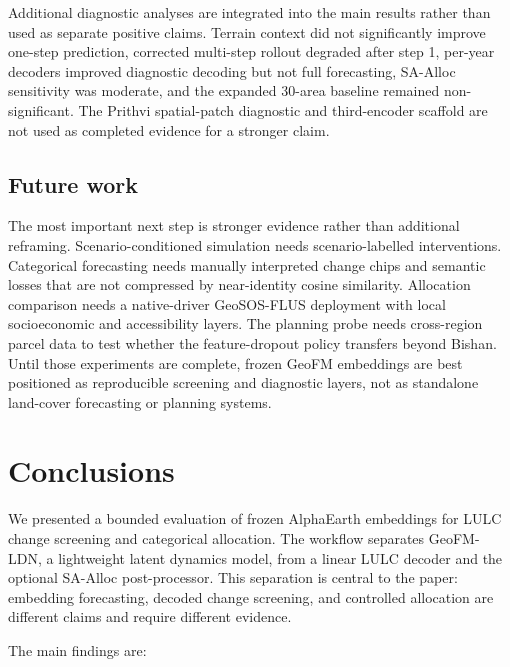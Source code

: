 \documentclass{article}
\begin{document}
Additional diagnostic analyses are integrated into the main results rather than used as separate positive claims. Terrain context did not significantly improve one-step prediction, corrected multi-step rollout degraded after step 1, per-year decoders improved diagnostic decoding but not full forecasting, SA-Alloc sensitivity was moderate, and the expanded 30-area baseline remained non-significant. The Prithvi spatial-patch diagnostic and third-encoder scaffold are not used as completed evidence for a stronger claim.

\subsection{Future work}
\label{sec:future}

The most important next step is stronger evidence rather than additional reframing. Scenario-conditioned simulation needs scenario-labelled interventions. Categorical forecasting needs manually interpreted change chips and semantic losses that are not compressed by near-identity cosine similarity. Allocation comparison needs a native-driver GeoSOS-FLUS deployment with local socioeconomic and accessibility layers. The planning probe needs cross-region parcel data to test whether the feature-dropout policy transfers beyond Bishan. Until those experiments are complete, frozen GeoFM embeddings are best positioned as reproducible screening and diagnostic layers, not as standalone land-cover forecasting or planning systems.

\section{Conclusions}
\label{sec:conclusions}

We presented a bounded evaluation of frozen AlphaEarth embeddings for LULC change screening and categorical allocation. The workflow separates GeoFM-LDN, a lightweight latent dynamics model, from a linear LULC decoder and the optional SA-Alloc post-processor. This separation is central to the paper: embedding forecasting, decoded change screening, and controlled allocation are different claims and require different evidence.

The main findings are:
\end{document}
